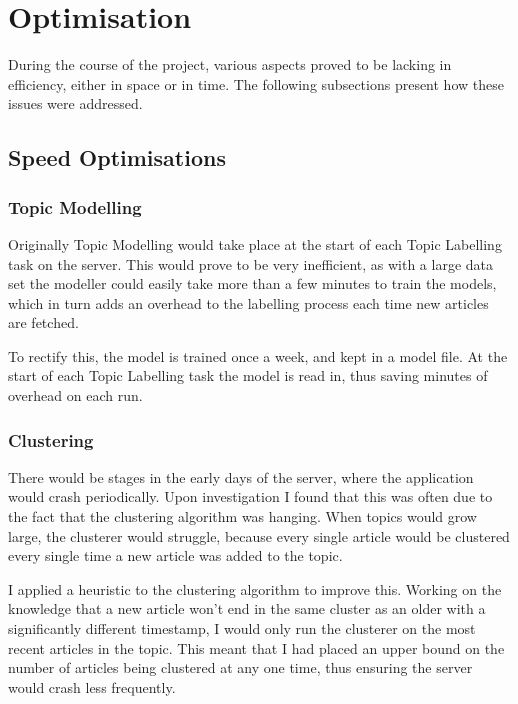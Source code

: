\documentclass[12pt]{article}
\begin{document}
\newpage

\section{Optimisation}

During the course of the project, various aspects proved to be lacking in efficiency, either in space or in time. The following subsections present how these issues were addressed. 

\subsection{Speed Optimisations}

\subsubsection{Topic Modelling}

Originally Topic Modelling would take place at the start of each Topic Labelling task on the server. This would prove to be very inefficient, as with a large data set the modeller could easily take more than a few minutes to train the models, which in turn adds an overhead to the labelling process each time new articles are fetched.

To rectify this, the model is trained once a week, and kept in a model file. At the start of each Topic Labelling task the model is read in, thus saving minutes of overhead on each run.

\label{topicmodellingoptimisation}

\subsubsection{Clustering}

There would be stages in the early days of the server, where the application would crash periodically. Upon investigation I found that this was often due to the fact that the clustering algorithm was hanging. When topics would grow large, the clusterer would struggle, because every single article would be clustered every single time a new article was added to the topic.

I applied a heuristic to the clustering algorithm to improve this. Working on the knowledge that a new article won't end in the same cluster as an older with a significantly different timestamp, I would only run the clusterer on the most recent articles in the topic. This meant that I had placed an upper bound on the number of articles being clustered at any one time, thus ensuring the server would crash less frequently.
\end{document}
